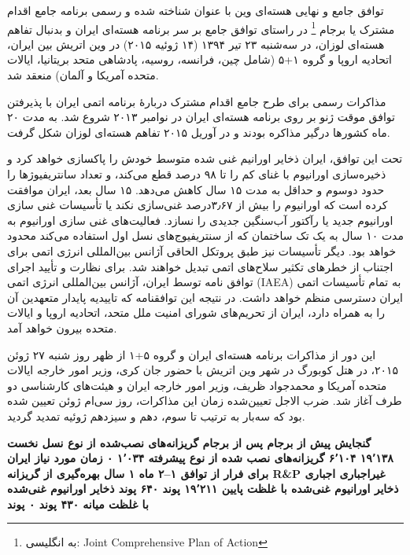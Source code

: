 
توافق جامع و نهایی هسته‌ای وین با عنوان شناخته شده و رسمی برنامه جامع اقدام مشترک یا برجام
\footnote{به انگلیسی: Joint Comprehensive Plan of Action}
 در راستای توافق جامع بر سر برنامه هسته‌ای ایران و بدنبال تفاهم هسته‌ای لوزان، در سه‌شنبه ۲۳ تیر ۱۳۹۴ (۱۴ ژوئیه ۲۰۱۵) در وین اتریش بین ایران، اتحادیه اروپا و گروه ۱+۵ (شامل چین، فرانسه، روسیه، پادشاهی متحد بریتانیا، ایالات متحده آمریکا و آلمان) منعقد شد.

مذاکرات رسمی برای طرح جامع اقدام مشترک دربارهٔ برنامه اتمی ایران با پذیرفتن توافق موقت ژنو بر روی برنامه هسته‌ای ایران در نوامبر ۲۰۱۳ شروع شد. به مدت ۲۰ ماه کشورها درگیر مذاکره بودند و در آوریل ۲۰۱۵ تفاهم هسته‌ای لوزان شکل گرفت.

تحت این توافق، ایران ذخایر اورانیم غنی شده متوسط خودش را پاکسازی خواهد کرد و ذخیره‌سازی اورانیوم با غنای کم را تا ۹۸ درصد قطع می‌کند، و تعداد سانتریفیوژها را حدود دوسوم و حداقل به مدت ۱۵ سال کاهش می‌دهد. ۱۵ سال بعد، ایران موافقت کرده است که اورانیوم را بیش از ۳٫۶۷درصد غنی‌سازی نکند یا تأسیسات غنی سازی اورانیوم جدید یا رآکتور آب‌سنگین جدیدی را نسازد. فعالیت‌های غنی سازی اورانیوم به مدت ۱۰ سال به یک تک ساختمان که از سنتریفیوج‌های نسل اول استفاده می‌کند محدود خواهد بود. دیگر تأسیسات نیز طبق پروتکل الحاقی آژانس بین‌المللی انرژی اتمی برای اجتناب از خطرهای تکثیر سلاح‌های اتمی تبدیل خواهند شد. برای نظارت و تأیید اجرای توافق نامه توسط ایران، آژانس بین‌المللی انرژی اتمی (IAEA) به تمام تأسیسات اتمی ایران دسترسی منظم خواهد داشت. در نتیجه این توافقنامه که تاییدیه پایدار متعهدین آن را به همراه دارد، ایران از تحریم‌های شورای امنیت ملل متحد، اتحادیه اروپا و ایالات متحده بیرون خواهد آمد.

این دور از مذاکرات برنامه هسته‌ای ایران و گروه ۵+۱ از ظهر روز شنبه ۲۷ ژوئن ۲۰۱۵، در هتل کوبورگ در شهر وین اتریش با حضور جان کری، وزیر امور خارجه ایالات متحده آمریکا و محمدجواد ظریف، وزیر امور خارجه ایران و هیئت‌های کارشناسی دو طرف آغاز شد. ضرب الاجل تعیین‌شده زمان این مذاکرات، روز سی‌ام ژوئن تعیین شده بود که سه‌بار به ترتیب تا سوم، دهم و سیزدهم ژوئیه تمدید گردید.


\startplacetable[location=force,number=no]
\righttoleft
\starttabulate[format={|c|c|c|},align=middle]
\HL
\NC\bf
گنجایش
\NC\bf
پیش از برجام
\NC\bf
پس از برجام
\NC
\NR
\HL
\NC
گریزانه‌های نصب‌شده از نوع نسل نخست
\NC
۱۹٬۱۳۸
\NC
۶٬۱۰۴
\NC
\NR
\NC
گریزانه‌های نصب شده از نوع پیشرفته
\NC
۱٬۰۳۴
\NC
۰
\NC
\NR
\NC
زمان مورد نیاز ایران برای فرار از توافق
\NC
۱--۲ ماه
\NC
۱ سال
\NC
\NR
\NC
بهره‌گیری از گریزانه R\&P
\NC
غیراجباری
\NC
اجباری
\NC
\NR
\NC
ذخایر اورانیوم غنی‌شده با غلظت پایین
\NC
۱۹٬۲۱۱ پوند
\NC
۶۴۰ پوند
\NC
\NR
\NC
ذخایر اورانیوم غنی‌شده با غلظت میانه
\NC
۴۳۰ پوند
\NC
۰ پوند
\NC
\NR
\HL
\stoptabulate
\stopplacetable
